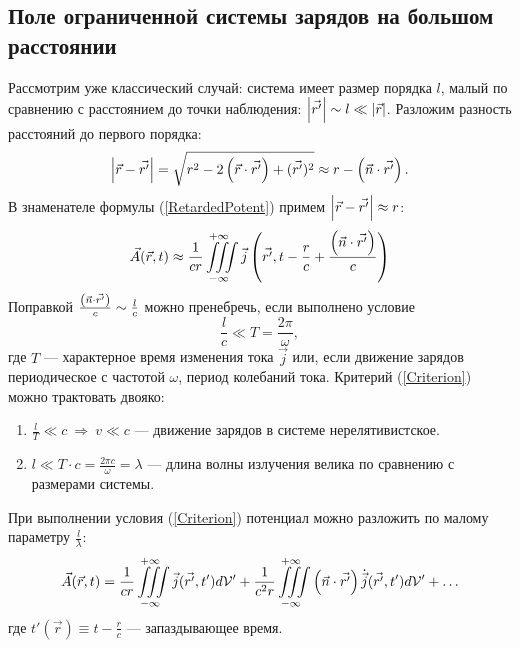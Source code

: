 \subsection{Поле ограниченной системы зарядов на большом расстоянии}
    Рассмотрим уже классический случай: система имеет размер порядка $l$, малый по сравнению с расстоянием до точки наблюдения:
    $\left|{\vec{r'}}\right| \sim l \ll \left|{\vec{r}}\right|$. Разложим разность расстояний до первого порядка:
    \[
        \left|{\vec{r} - \vec{r'}}\right| = \sqrt{r^2 - 2\left({\vec{r}\cdot\vec{r'}}\right) + (\vec{r'})^2}
        \approx r - \left({\vec{n}\cdot\vec{r'}}\right).
    \]
    В знаменателе формулы (\ref{RetardedPotent}) примем $\left|{\vec{r} - \vec{r'}}\right| \approx r$:
    \begin{equation}
        \vec{A}(\vec{r}, t) \approx \frac{1}{cr}\iiint\limits_{-\infty}^{+\infty}
        \vec{j}\left({\vec{r'}, t - \frac rc + \frac{\left({\vec{n}\cdot\vec{r'}}\right)}{c}}\right) \label{ApproxPotent}
    \end{equation}
    Поправкой $\frac{\left({\vec{n}\cdot\vec{r'}}\right)}{c} \sim \frac lc$ можно пренебречь, если выполнено условие
    \begin{equation}
        \frac lc \ll T = \frac{2\pi}{\omega}, \label{Criterion}
    \end{equation}
    где $T$ --- характерное время изменения тока $\vec{j}$ или, если движение зарядов периодическое с частотой $\omega$, период колебаний тока.
    Критерий (\ref{Criterion}) можно трактовать двояко:
    \begin{enumerate}
        \item $\frac lT \ll c \: \Rightarrow \: v \ll c$ --- движение зарядов в системе нерелятивистское.
        \item $l \ll T\cdot c = \frac{2\pi c}{\omega} = \lambda$ --- длина волны излучения велика по сравнению с размерами системы.
    \end{enumerate}
    При выполнении условия (\ref{Criterion}) потенциал можно разложить по малому параметру $\frac l{\lambda}$:
    \[
        \vec{A}(\vec{r}, t) = \frac{1}{cr} \iiint\limits_{-\infty}^{+\infty} \vec{j}(\vec{r'}, t') d\mathcal{V}' + 
        \frac{1}{c^2r} \iiint\limits_{-\infty}^{+\infty} \left({\vec{n}\cdot\vec{r'}}\right)\dot{\vec{j}}(\vec{r'}, t')d\mathcal{V}' + \ldots
    \]
    где $t'(\vec{r}) \equiv t - \frac{r}{c}$ --- запаздывающее время.

